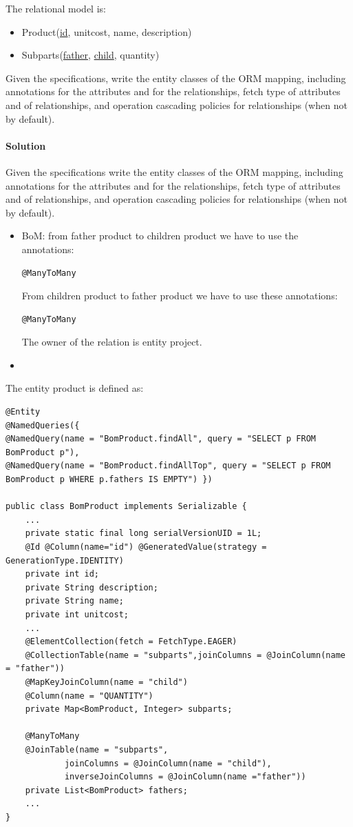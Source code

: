 The relational model is: 
\begin{itemize}
    \item Product(\underline{id}, unitcost, name, description)
    \item Subparts(\underline{father}, \underline{child}, quantity)
\end{itemize}
Given the specifications, write the entity classes of the ORM mapping, including annotations for the attributes and for the relationships, fetch type of attributes and of relationships, and operation cascading policies for relationships (when not by default).

\paragraph*{Solution}
Given the specifications write the entity classes of the ORM mapping, including annotations for the attributes and for the relationships, fetch type of attributes and of relationships, and operation cascading policies for relationships (when not by default). 
\begin{itemize}
    \item BoM: from father product to children product we have to use the annotations: 
        \begin{lstlisting}[style=Java]
@ManyToMany
        \end{lstlisting}
        From children product to father product we have to use these annotations: 
        \begin{lstlisting}[style=Java]
@ManyToMany
        \end{lstlisting}
        The owner of the relation is entity project. 
    \item 
\end{itemize}
The entity product is defined as:  
    \begin{lstlisting}[style=Java]
@Entity
@NamedQueries({
@NamedQuery(name = "BomProduct.findAll", query = "SELECT p FROM BomProduct p"),
@NamedQuery(name = "BomProduct.findAllTop", query = "SELECT p FROM BomProduct p WHERE p.fathers IS EMPTY") })

public class BomProduct implements Serializable {
    ...
    private static final long serialVersionUID = 1L;
    @Id @Column(name="id") @GeneratedValue(strategy = GenerationType.IDENTITY)
    private int id;
    private String description;
    private String name;
    private int unitcost;
    ...
    @ElementCollection(fetch = FetchType.EAGER)
    @CollectionTable(name = "subparts",joinColumns = @JoinColumn(name = "father"))
    @MapKeyJoinColumn(name = "child")
    @Column(name = "QUANTITY")
    private Map<BomProduct, Integer> subparts;

    @ManyToMany
    @JoinTable(name = "subparts",
            joinColumns = @JoinColumn(name = "child"),
            inverseJoinColumns = @JoinColumn(name ="father"))
    private List<BomProduct> fathers;
    ...            
}
    \end{lstlisting}
